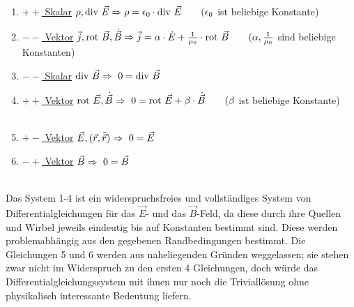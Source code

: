 \begin{enumerate}
\item
\underline{$++$ Skalar} \quad $\rho,\text{div} \ \vec{E}\\
\\
\Rightarrow \rho = \epsilon_0 \cdot \text{div} \ \vec{E} \qquad (\epsilon_0$  ist beliebige Konstante)

\item
\underline{$--$ Vektor} \quad $\vec{j}, \text{rot} \ \vec{B},\dot{\vec{B}}\\
\\
\Rightarrow \vec{j} = \alpha\cdot\dot{E} + \frac{1}{\mu_0}\cdot\text{rot} \ \vec{B}  \qquad (\alpha,\frac{1}{\mu_0}$ sind beliebige Konstanten)

\item
\underline{$--$ Skalar} \quad $\text{div} \ \vec{B}\\ 
\\
\Rightarrow \ 0 = \text{div} \ \vec{B}$

\item
\underline{$++$ Vektor} \quad $\text{rot} \ \vec{E},\dot{\vec{B}}\\
\\
\Rightarrow \ 0 = \text{rot} \ \vec{E} + \beta\cdot\dot{\vec{B}} \qquad (\beta$  ist beliebige Konstante)
\\
\\

\item
\underline{$+-$ Vektor}  \quad $\vec{E},(\vec{r},\ddot{\vec{r}})\\
\\
\Rightarrow \ 0 =  \vec{E}$

\item
\underline{$-+$ Vektor} \quad $\vec{B}\\
\\
\Rightarrow \ 0 = \vec{B}$
\end{enumerate}
\ \\

Das System 1-4 ist ein widerspruchsfreies und vollständiges System von Differentialgleichungen für das $\vec{E}$- und das $\vec{B}$-Feld, da diese durch ihre Quellen und Wirbel jeweils eindeutig bis auf Konstanten bestimmt sind. Diese werden problemabhängig aus den gegebenen Randbedingungen bestimmt. Die Gleichungen 5 und 6 werden aus naheliegenden Gründen weggelassen; sie stehen zwar nicht im Widerspruch zu den ersten 4 Gleichungen, doch würde das Differentialgleichungssystem mit ihnen nur noch die Triviallösung ohne physikalisch interessante Bedeutung liefern.\
\\
\ \\
\ \\

